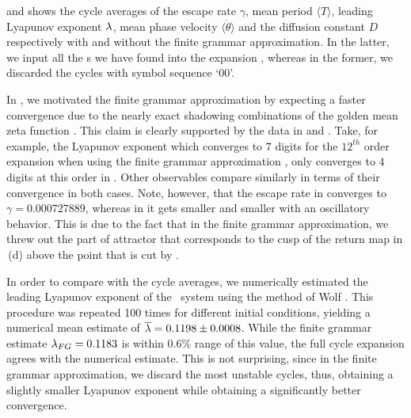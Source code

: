  and  shows
the cycle averages of the escape rate $\gamma$, mean period
$\langle T \rangle$, leading Lyapunov exponent $\lambda$, mean phase velocity
$\langle \dot{\theta} \rangle$ and the diffusion constant $D$ respectively
with and without the finite grammar approximation. In the latter, we input
all the \rpo s we have found into the expansion
, whereas in the former, we discarded the
cycles with symbol sequence `00'.




In , we motivated the finite grammar approximation by expecting a faster convergence
due to the nearly exact shadowing combinations of the golden mean zeta function
. This claim is clearly supported by the
data in  and
. Take, for example, the Lyapunov exponent
which converges to $7$ digits for the $12^{th}$ order expansion when using the finite
grammar approximation
, only converges to $4$ digits at this order in
. Other observables compare similarly in
terms of their convergence in both cases. Note, however, that the escape rate
in  converges to $\gamma = 0.000727889$, whereas
in  it gets smaller and smaller with an
oscillatory behavior. This is due to the fact that in the finite grammar
approximation, we threw out the part of attractor that corresponds to the
cusp of the return map in \,(d) above the point that
is cut by .

In order to compare with the cycle averages, we numerically estimated the
leading Lyapunov exponent of the \twomode\ system using the method of
Wolf \etal{}. This procedure was repeated 100 times for
different initial conditions, yielding a numerical mean estimate of
$\overline{\lambda} = 0.1198 \pm 0.0008$. While the finite grammar
estimate $\lambda_{FG} = 0.1183$ is within $0.6\%$ range of this value,
the full cycle expansion agrees with the numerical estimate. This is not
surprising, since in the finite grammar approximation, we discard the
most unstable cycles, thus, obtaining a slightly smaller Lyapunov
exponent while obtaining a significantly better convergence.
